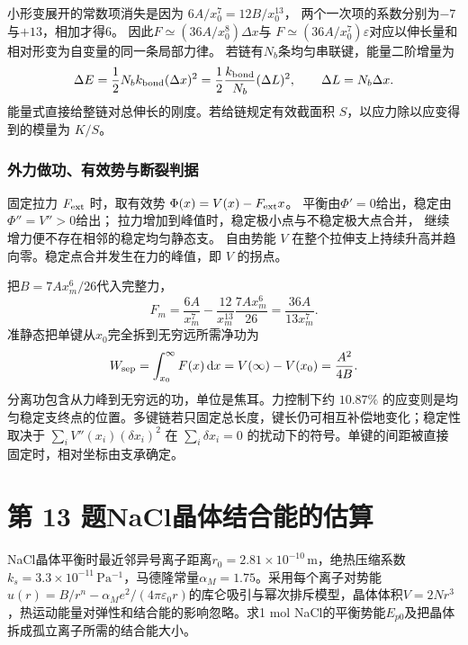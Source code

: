 \documentclass[UTF8,fontset=fandol,a4paper,11pt]{ctexart}
\newcommand{\dd}{\mathop{}\!\mathrm{d}}
\newcommand{\figcaption}[1]{\par\vspace{2pt}{\small\color{muted}#1}\par}
\begin{document}
小形变展开的常数项消失是因为
$6A/x_0^7=12B/x_0^{13}$，
两个一次项的系数分别为$-7$与$+13$，相加才得6。
因此$F\simeq(36A/x_0^8)\Delta x$与
$F\simeq(36A/x_0^7)\varepsilon$对应以伸长量和相对形变为自变量的同一条局部力律。
若链有$N_b$条均匀串联键，能量二阶增量为
\[
\Delta E=\frac12N_b k_{\rm bond}(\Delta x)^2
=\frac12\frac{k_{\rm bond}}{N_b}(\Delta L)^2,
\qquad\Delta L=N_b\Delta x.
\]
能量式直接给整链对总伸长的刚度。若给链规定有效截面积 $S$，以应力除以应变得到的模量为 $K/S$。

\subsubsection*{外力做功、有效势与断裂判据}
固定拉力 $F_{\rm ext}$ 时，取有效势
$\Phi(x)=V(x)-F_{\rm ext}x$。
平衡由$\Phi'=0$给出，稳定由$\Phi''=V''>0$给出；
拉力增加到峰值时，稳定极小点与不稳定极大点合并，
继续增力便不存在相邻的稳定均匀静态支。
自由势能 $V$ 在整个拉伸支上持续升高并趋向零。稳定点合并发生在力的峰值，即 $V$ 的拐点。

把$B=7Ax_m^6/26$代入完整力，
\[
F_m=\frac{6A}{x_m^7}-\frac{12}{x_m^{13}}\frac{7Ax_m^6}{26}
=\frac{36A}{13x_m^7}.
\]
准静态把单键从$x_0$完全拆到无穷远所需净功为
\[
W_{\rm sep}=\int_{x_0}^{\infty}F(x)\dd x
=V(\infty)-V(x_0)=\frac{A^2}{4B}.
\]
分离功包含从力峰到无穷远的功，单位是焦耳。力控制下约 $10.87\%$ 的应变则是均匀稳定支终点的位置。多键链若只固定总长度，键长仍可相互补偿地变化；稳定性取决于 $\sum_i V''(x_i)(\delta x_i)^2$ 在 $\sum_i\delta x_i=0$ 的扰动下的符号。单键的间距被直接固定时，相对坐标由支承确定。




\section*{第 13 题\quad NaCl晶体结合能的估算}

NaCl晶体平衡时最近邻异号离子距离$r_0=2.81\times10^{-10}\,\mathrm m$，绝热压缩系数$k_s=3.3\times10^{-11}\,\mathrm{Pa^{-1}}$，马德隆常量$\alpha_M=1.75$。采用每个离子对势能$u(r)=B/r^n-\alpha_M e^2/(4\pi\varepsilon_0r)$的库仑吸引与幂次排斥模型，晶体体积$V=2Nr^3$，热运动能量对弹性和结合能的影响忽略。求1 mol NaCl的平衡势能$E_{p0}$及把晶体拆成孤立离子所需的结合能大小。

\begin{center}\begin{minipage}{0.96\linewidth}\centering{}\figcaption{图 热4.13　马德隆常量计入整个晶格的静电作用。}\end{minipage}\end{center}
\end{document}
